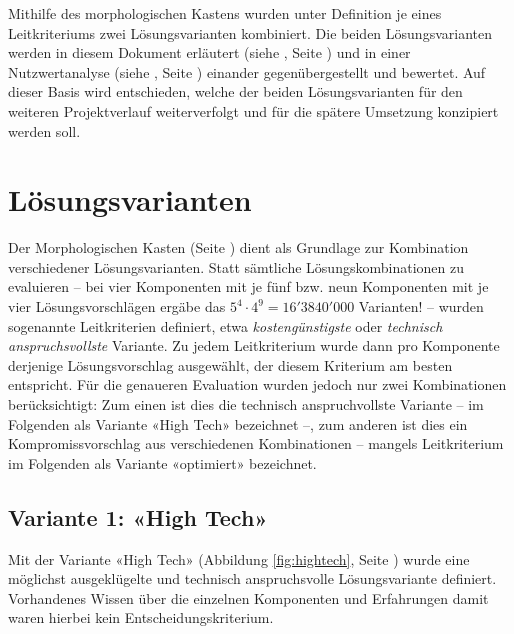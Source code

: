\documentclass[a4paper,11pt]{scrartcl}
\begin{document}
Mithilfe des morphologischen Kastens wurden unter Definition je eines Leitkriteriums zwei Lösungsvarianten kombiniert. Die beiden Lösungsvarianten werden in diesem Dokument erläutert (siehe , Seite \pageref{lbl:Lösungsvarianten}) und in einer Nutzwertanalyse (siehe , Seite \pageref{lbl:Nutzwertanalyse}) einander gegenübergestellt und bewertet. Auf dieser Basis wird entschieden, welche der beiden Lösungsvarianten für den weiteren Projektverlauf weiterverfolgt und für die spätere Umsetzung konzipiert werden soll.

\newpage

\section{Lösungsvarianten}
\label{lbl:Lösungsvarianten}

Der Morphologischen Kasten (Seite \pageref{lbl:MorphologischerKasten}) dient als Grundlage zur Kombination verschiedener Lösungsvarianten. Statt sämtliche Lösungskombinationen zu evaluieren -- bei vier Komponenten mit je fünf bzw. neun Komponenten mit je vier Lösungsvorschlägen ergäbe das $5^4 \cdot 4^9 = 16'3840'000$ Varianten! -- wurden sogenannte Leitkriterien definiert, etwa \textit{kostengünstigste} oder \textit{technisch anspruchsvollste} Variante. Zu jedem Leitkriterium wurde dann pro Komponente derjenige Lösungsvorschlag ausgewählt, der diesem Kriterium am besten entspricht.
Für die genaueren Evaluation wurden jedoch nur zwei Kombinationen berücksichtigt: Zum einen ist dies die technisch anspruchvollste Variante -- im Folgenden als Variante «High Tech» bezeichnet --, zum anderen ist dies ein Kompromissvorschlag aus verschiedenen Kombinationen -- mangels Leitkriterium im Folgenden als Variante «optimiert» bezeichnet.

\subsection{Variante 1: «High Tech»}

Mit der Variante «High Tech» (Abbildung \ref{fig:hightech}, Seite \pageref{fig:hightech}) wurde eine möglichst ausgeklügelte und technisch anspruchsvolle Lösungsvariante definiert. Vorhandenes Wissen über die einzelnen Komponenten und Erfahrungen damit waren hierbei kein Entscheidungskriterium.
\end{document}
